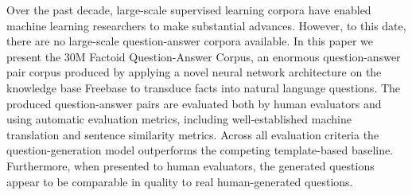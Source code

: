 Over the past decade, large-scale supervised learning corpora have enabled machine learning researchers to make substantial advances. However, to this date, there are no large-scale question-answer corpora available. In this paper we present the 30M Factoid Question-Answer Corpus, an enormous question-answer pair corpus produced by applying a novel neural network architecture on the knowledge base Freebase to transduce facts into natural language questions. The produced question-answer pairs are evaluated both by human evaluators and using automatic evaluation metrics, including well-established machine translation and sentence similarity metrics. Across all evaluation criteria the question-generation model outperforms the competing template-based baseline. Furthermore, when presented to human evaluators, the generated questions appear to be comparable in quality to real human-generated questions.
